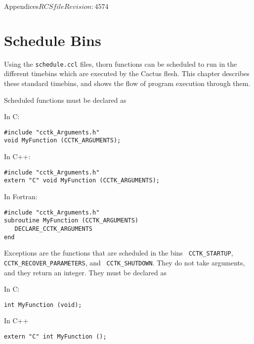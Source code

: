 \begin{cactuspart}{Appendices}{$RCSfile$}{$Revision: 4574 $}


\chapter{Schedule Bins}
\label{sec:Appendix.schedule_bins}

Using the {\tt schedule.ccl} files, thorn functions can be scheduled to run 
in the different timebins which are executed by the Cactus flesh. This chapter
describes these standard timebins, and shows the flow of program execution
through them.

Scheduled functions must be declared as
\begin{Lentry}

\item[In C:]
\begin{verbatim}
#include "cctk_Arguments.h"
void MyFunction (CCTK_ARGUMENTS);
\end{verbatim}

\item[In C++:]
\begin{verbatim}
#include "cctk_Arguments.h"
extern "C" void MyFunction (CCTK_ARGUMENTS);
\end{verbatim}

\item[In Fortran:]
\begin{verbatim}
#include "cctk_Arguments.h"
subroutine MyFunction (CCTK_ARGUMENTS)
   DECLARE_CCTK_ARGUMENTS
end
\end{verbatim}
\end{Lentry}

Exceptions are the functions that are scheduled in the bins {\tt
CCTK\_STARTUP}, {\tt CCTK\_RECOVER\_PARAMETERS}, and {\tt
CCTK\_SHUTDOWN}.  They do not take arguments,
and they return an integer.  They must be declared as
\begin{Lentry}

\item[In C:]
\begin{verbatim}
int MyFunction (void);
\end{verbatim}

\item[In C++]
\begin{verbatim}
extern "C" int MyFunction ();
\end{verbatim}


\end{Lentry}
\end{cactuspart}
